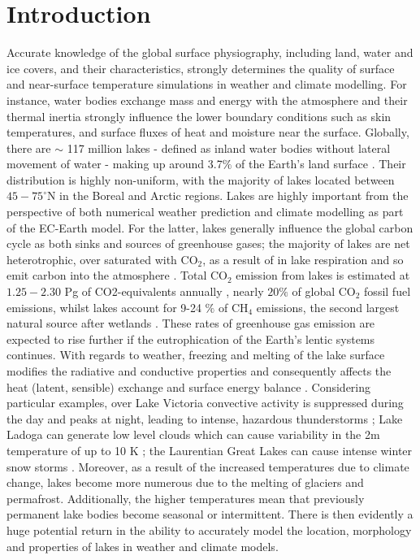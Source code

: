 \documentclass[hess, twostagejnl]{copernicus}
\begin{document}
\section{Introduction}
Accurate knowledge of the global surface physiography, including land, water and ice covers, and their characteristics, strongly determines the quality of surface and near-surface temperature simulations in weather and climate modelling. For instance, water bodies exchange mass and energy with the atmosphere and their thermal inertia strongly influence the lower boundary conditions such as skin temperatures, and surface fluxes of heat and moisture near the surface. Globally, there are $\sim$ 117 million lakes - defined as inland water bodies without lateral movement of water - making up around 3.7$\%$ of the Earth's land surface \citep{Verpoorter2014}. Their distribution is highly non-uniform, with the majority of lakes located between $45-75^{\circ}$N in the Boreal and Arctic regions. Lakes are highly important from the perspective of both numerical weather prediction and climate modelling as part of the EC-Earth model. For the latter, lakes generally influence the global carbon cycle as both sinks and sources of greenhouse gases; the majority of lakes are net heterotrophic, over saturated with CO$_2$, as a result of in lake respiration and so emit carbon into the atmosphere \citep{Pace2005,Tranvik2009}.  Total CO$_2$ emission from lakes is estimated at $1.25 - 2.30$ Pg of CO2-equivalents annually \citep{DelSontro2018}, nearly $20 \%$ of global CO$_2$ fossil fuel emissions, whilst lakes account for 9-24 $\%$  of CH$_4$ emissions, the second largest natural source after wetlands \citep{Saunois2020}. These rates of greenhouse gas emission are expected to rise further if the eutrophication of the Earth's lentic systems continues. With regards to weather, freezing and melting of the lake surface modifies the radiative and conductive properties and consequently affects the heat (latent, sensible) exchange and surface energy balance \citep{Huang2019,Peng2020,Franz2018}. Considering particular examples, over Lake Victoria convective activity is suppressed during the day and peaks at night, leading to intense, hazardous thunderstorms \citep{Thiery2015,Thiery_2017}; Lake Ladoga can generate low level clouds which can cause variability in the 2m temperature of up to 10 K \citep{Eerola2014}; the Laurentian Great Lakes can cause intense winter snow storms \citep{Notaro2013,Vavrus2013}. Moreover, as a result of the increased temperatures due to climate change, lakes become more numerous due to the melting of glaciers and permafrost. Additionally, the higher temperatures mean that previously permanent lake bodies become seasonal or intermittent. There is then evidently a huge potential return in the ability to accurately model the location, morphology and properties of lakes in weather and climate models. \newline 
\end{document}
